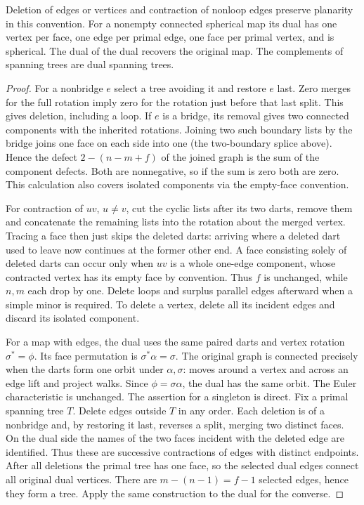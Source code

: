 \begin{proposition}\leavevmode\label{prop:dual}
Deletion of edges or vertices and contraction of nonloop edges preserve
planarity in this convention. For a nonempty connected spherical map its
dual has one vertex per face, one edge per primal edge, one face per primal
vertex, and is spherical. The dual of the dual recovers the original map.
The complements of spanning trees are dual spanning trees.
\end{proposition}
\begin{proof}
For a nonbridge $e$ select a tree avoiding it and restore $e$ last. Zero
merges for the full rotation imply zero for the rotation just before that
last split. This gives deletion, including a loop. If $e$ is a bridge, its
removal gives two connected components with the inherited rotations.
Joining two such boundary lists by the bridge joins one face on each side
into one (the two-boundary splice above). Hence the defect
$2-(n-m+f)$ of the joined graph is the sum of the component defects. Both
are nonnegative, so if the sum is zero both are zero. This calculation
also covers isolated components via the empty-face convention.

For contraction of $uv$, $u\ne v$, cut the cyclic lists after its two darts,
remove them and concatenate the remaining lists into the rotation about the
merged vertex. Tracing a face then just skips the deleted darts: arriving
where a deleted dart used to leave now continues at the former other end.
A face consisting solely of deleted darts can occur only when $uv$ is a whole
one-edge component, whose contracted vertex has its empty face by convention.
Thus $f$ is unchanged, while $n,m$ each drop by one. Delete loops and surplus
parallel edges afterward when a simple minor is required. To delete a vertex,
delete all its incident edges and discard its isolated component.

For a map with edges, the dual uses the same paired darts and vertex
rotation $\sigma^*=\phi$. Its face permutation is $\sigma^*\alpha=\sigma$.
The original graph is connected precisely when the darts form one orbit
under $\alpha,\sigma$: moves around a vertex and across an edge lift and
project walks. Since $\phi=\sigma\alpha$, the dual has the same orbit.
The Euler characteristic is unchanged. The assertion for a singleton is
direct. Fix a primal spanning tree $T$. Delete edges outside $T$ in any
order. Each deletion is of a nonbridge and, by restoring it last, reverses
a split, merging two distinct faces. On the dual side the names of the two faces incident with the deleted edge are identified. Thus these are successive
contractions of edges with distinct endpoints. After all deletions the
primal tree has one face, so the selected dual edges connect all original
dual vertices. There are $m-(n-1)=f-1$ selected edges, hence they form a
tree. Apply the same construction to the dual for the converse.
\end{proof}

